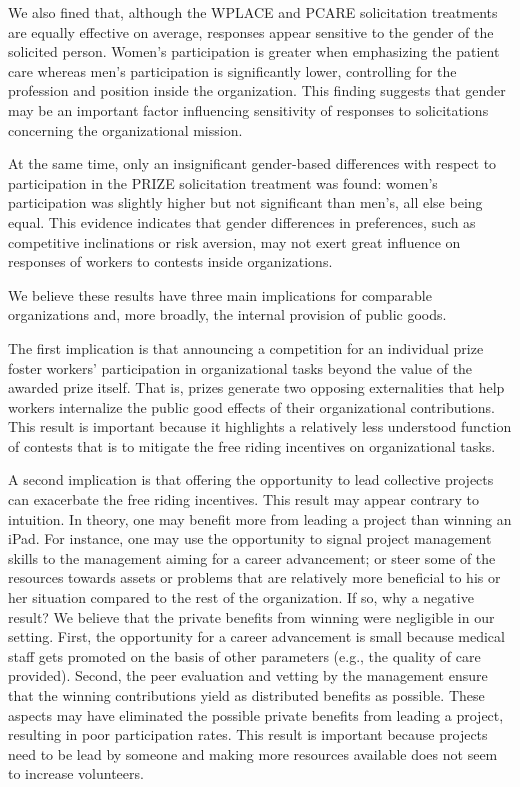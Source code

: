 \documentclass[12pt, titlepage]{article}
\begin{document}
We also fined that, although the WPLACE and PCARE solicitation
treatments are equally effective on average, responses appear sensitive
to the gender of the solicited person. Women's participation is greater
when emphasizing the patient care whereas men's participation is
significantly lower, controlling for the profession and position inside
the organization. This finding suggests that gender may be an important
factor influencing sensitivity of responses to solicitations concerning
the organizational mission.

At the same time, only an insignificant gender-based differences with
respect to participation in the PRIZE solicitation treatment was found:
women's participation was slightly higher but not significant than
men's, all else being equal. This evidence indicates that gender
differences in preferences, such as competitive inclinations or risk
aversion, may not exert great influence on responses of workers to
contests inside organizations.

We believe these results have three main implications for comparable
organizations and, more broadly, the internal provision of public goods.

The first implication is that announcing a competition for an individual
prize foster workers' participation in organizational tasks beyond the
value of the awarded prize itself. That is, prizes generate two opposing
externalities that help workers internalize the public good effects of
their organizational contributions. This result is important because it
highlights a relatively less understood function of contests that is to
mitigate the free riding incentives on organizational tasks.

A second implication is that offering the opportunity to lead collective
projects can exacerbate the free riding incentives. This result may
appear contrary to intuition. In theory, one may benefit more from
leading a project than winning an iPad. For instance, one may use the
opportunity to signal project management skills to the management aiming
for a career advancement; or steer some of the resources towards assets
or problems that are relatively more beneficial to his or her situation
compared to the rest of the organization. If so, why a negative result?
We believe that the private benefits from winning were negligible in our
setting. First, the opportunity for a career advancement is small
because medical staff gets promoted on the basis of other parameters
(e.g., the quality of care provided). Second, the peer evaluation and
vetting by the management ensure that the winning contributions yield as
distributed benefits as possible. These aspects may have eliminated the
possible private benefits from leading a project, resulting in poor
participation rates. This result is important because projects need to
be lead by someone and making more resources available does not seem to
increase volunteers.
\end{document}
